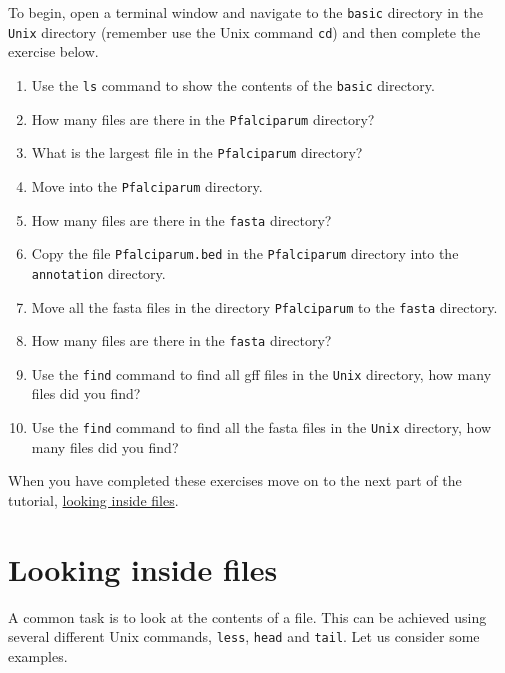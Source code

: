 \documentclass[11pt]{article}
\providecommand{\tightlist}{%
      \setlength{\itemsep}{0pt}\setlength{\parskip}{0pt}}
\begin{document}
To begin, open a terminal window and navigate to the \texttt{basic}
directory in the \texttt{Unix} directory (remember use the Unix command
\texttt{cd}) and then complete the exercise below.

\begin{enumerate}
\def\labelenumi{\arabic{enumi}.}
\tightlist
\item
  Use the \texttt{ls} command to show the contents of the \texttt{basic}
  directory.
\item
  How many files are there in the \texttt{Pfalciparum} directory?
\item
  What is the largest file in the \texttt{Pfalciparum} directory?
\item
  Move into the \texttt{Pfalciparum} directory.
\item
  How many files are there in the \texttt{fasta} directory?
\item
  Copy the file \texttt{Pfalciparum.bed} in the \texttt{Pfalciparum}
  directory into the \texttt{annotation} directory.
\item
  Move all the fasta files in the directory \texttt{Pfalciparum} to the
  \texttt{fasta} directory.
\item
  How many files are there in the \texttt{fasta} directory?
\item
  Use the \texttt{find} command to find all gff files in the
  \texttt{Unix} directory, how many files did you find?
\item
  Use the \texttt{find} command to find all the fasta files in the
  \texttt{Unix} directory, how many files did you find?
\end{enumerate}

    When you have completed these exercises move on to the next part of the
tutorial, \href{files.ipynb}{looking inside files}.





\newpage





    \hypertarget{looking-inside-files}{%
\section{Looking inside files}\label{looking-inside-files}}

A common task is to look at the contents of a file. This can be achieved
using several different Unix commands, \texttt{less}, \texttt{head} and
\texttt{tail}. Let us consider some examples.
\end{document}

